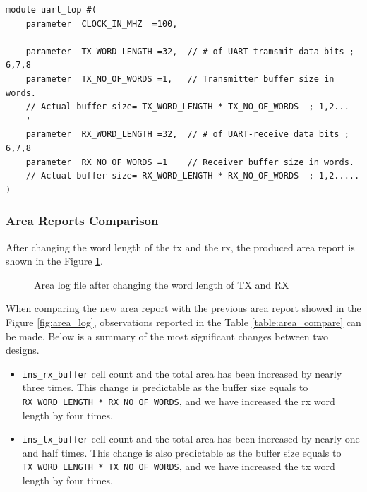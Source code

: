 \documentclass[a4paper,11pt]{article}%
\begin{document}
\begin{Verbatim}[frame=single]
module uart_top #(
    parameter  CLOCK_IN_MHZ  =100,
    
    parameter  TX_WORD_LENGTH =32,  // # of UART-tramsmit data bits ; 6,7,8
    parameter  TX_NO_OF_WORDS =1,   // Transmitter buffer size in words.
    // Actual buffer size= TX_WORD_LENGTH * TX_NO_OF_WORDS  ; 1,2...
    '
    parameter  RX_WORD_LENGTH =32,  // # of UART-receive data bits ; 6,7,8
    parameter  RX_NO_OF_WORDS =1    // Receiver buffer size in words.
    // Actual buffer size= RX_WORD_LENGTH * RX_NO_OF_WORDS  ; 1,2.....
)
\end{Verbatim}

\subsubsection{Area Reports Comparison}

After changing the word length of the \ac{tx} and the \ac{rx}, the produced area report is shown in the Figure \ref{fig:area_log2}.

\begin{figure}[h]
	\centering
	\caption{Area log file after changing the word length of TX and RX}
	\label{fig:area_log2}
\end{figure}

When comparing the new area report with the previous area report showed in the Figure \ref{fig:area_log}, observations reported in the Table \ref{table:area_compare} can be made. Below is a summary of the most significant changes between two designs.

\begin{itemize}
	\item {\tt ins\_rx\_buffer} cell count and the total area has been increased by nearly three times. This change is predictable as the buffer size equals to {\tt RX\_WORD\_LENGTH * RX\_NO\_OF\_WORDS}, and we have increased the \ac{rx} word length by four times.
	
	\item {\tt ins\_tx\_buffer} cell count and the total area has been increased by nearly one and half times. This change is also predictable as the buffer size equals to {\tt TX\_WORD\_LENGTH * TX\_NO\_OF\_WORDS}, and we have increased the \ac{tx} word length by four times.
\end{itemize}
\end{document}
